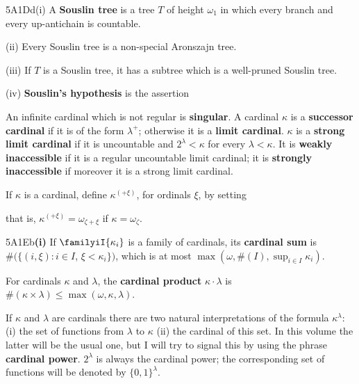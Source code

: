 \spheader 5A1Dd(i) A {\bf Souslin tree} is a tree $T$ of height $\omega_1$
in which every branch and every up-antichain is countable.

\quad(ii) Every Souslin tree is a non-special Aronszajn tree.

\quad(iii) If $T$ is a Souslin tree,
it has a subtree which is a well-pruned
Souslin tree.   

\quad(iv) {\bf Souslin's hypothesis} is the assertion


 An infinite cardinal which is
not regular is {\bf singular}.
A cardinal $\kappa$ is a {\bf successor cardinal} if it is of the form
$\lambda^+$;  otherwise it is a {\bf limit cardinal}.
$\kappa$ is a
{\bf strong limit cardinal} if it is uncountable and $2^{\lambda}<\kappa$
for every $\lambda<\kappa$.   It 
is {\bf weakly inaccessible} if it is a regular uncountable limit
cardinal;  it is {\bf strongly inaccessible} if moreover it is a strong
limit cardinal.

\medskip

 If $\kappa$ is a cardinal,
define $\kappa^{(+\xi)}$, for ordinals $\xi$, by setting


\noindent that is, $\kappa^{(+\xi)}=\omega_{\zeta+\xi}$ if
$\kappa=\omega_{\zeta}$.

\medskip

\spheader 5A1Eb{\bf (i)} If $\familyiI{\kappa_i}$ is a
family of cardinals, its {\bf cardinal sum} is
$\#(\{(i,\xi):i\in I$, $\xi<\kappa_i\})$, which is at most
$\max(\omega,\#(I),\sup_{i\in I}\kappa_i)$.

\medskip

 For cardinals $\kappa$ and $\lambda$,
the {\bf cardinal product} $\kappa\cdot\lambda$ is
$\#(\kappa\times\lambda)\le\max(\omega,\kappa,\lambda)$.

\medskip

 If $\kappa$ and
$\lambda$ are cardinals there are two natural interpretations
of the formula $\kappa^{\lambda}$:  (i) the set of functions from $\lambda$
to $\kappa$ (ii) the cardinal of this set.   In this volume the latter will
be the usual one, but I will try to signal this by using the phrase {\bf
cardinal power}.   
$2^{\lambda}$ is always the cardinal power;
the corresponding set of functions will be denoted
by $\{0,1\}^{\lambda}$.   


